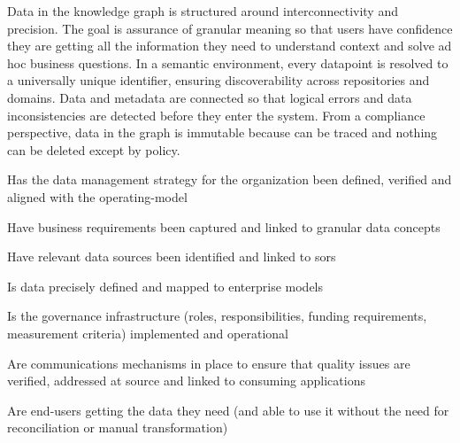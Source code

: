 %
%

\ekgmmCapabilitySectionContributionToEnterprise

Data in the knowledge graph is structured around interconnectivity and precision.
The goal is assurance of granular meaning so that users have confidence they are getting all the information they
need to understand context and solve ad hoc business questions.
In a semantic environment, every datapoint is resolved to a universally unique identifier, ensuring discoverability
across repositories and domains.
Data and metadata are connected so that logical errors and data inconsistencies are detected before they enter
the system.
From a compliance perspective, data in the graph is immutable because  can be traced and
nothing can be deleted except by policy.

\ekgmmCapabilitySectionDimensions

\begin{core-questions}

  \item [\thesection.1] Has the data management strategy for the organization been defined, verified and aligned
                        with the \gls{operating-model}
  \item [\thesection.2] Have business requirements been captured and linked to granular data concepts
  \item [\thesection.3] Have relevant data sources been identified and linked to \glspl{sor}
  \item [\thesection.4] Is data precisely defined and mapped to enterprise models
  \item [\thesection.5] Is the governance infrastructure (roles, responsibilities, funding requirements,
                        measurement criteria) imple\-mented and operational
  \item [\thesection.6] Are communications mechanisms in place to ensure that quality issues are verified,
                        addressed at source and linked to consuming applications
  \item [\thesection.7] Are end-users getting the data they need (and able to use it without the need for
                        reconciliation or manual transformation)

\end{core-questions}

